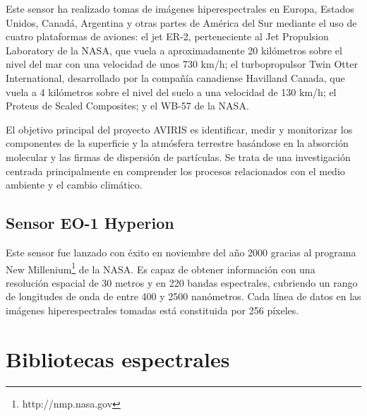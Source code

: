 Este sensor ha realizado tomas de imágenes hiperespectrales en Europa, Estados Unidos, Canadá, Argentina y otras partes de América del Sur mediante el uso de cuatro plataformas de aviones: el jet ER-2, perteneciente al Jet Propulsion Laboratory de la NASA, que vuela a aproximadamente 20 kilómetros sobre el nivel del mar con una velocidad de unos 730 km/h; el turbopropulsor Twin Otter International, desarrollado por la compañía canadiense Havilland Canada, que vuela a 4 kilómetros sobre el nivel del suelo a una velocidad de 130 km/h; el Proteus de Scaled Composites; y el WB-57 de la NASA.

El objetivo principal del proyecto AVIRIS es identificar, medir y monitorizar los componentes de la superficie y la atmósfera terrestre basándose en la absorción molecular y las firmas de dispersión de partículas. Se trata de una investigación centrada principalmente en comprender los procesos relacionados con el medio ambiente y el cambio climático.



\subsection{Sensor EO-1 Hyperion}

Este sensor fue lanzado con éxito en noviembre del año 2000 gracias al programa New Millenium\footnote{http://nmp.nasa.gov} de la NASA. Es capaz de obtener información con una resolución espacial de 30 metros y en 220 bandas espectrales, cubriendo un rango de longitudes de onda de entre 400 y 2500 nanómetros. Cada línea de datos en las imágenes hiperespectrales tomadas está constituida por 256 píxeles.



\section{Bibliotecas espectrales}

